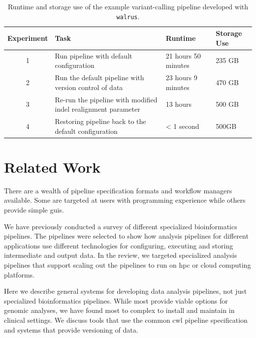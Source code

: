 \begin{table}[ht!]
    \centering
    \caption{Runtime and storage use of the example variant-calling pipeline
    developed with \texttt{walrus}.} 
    \begin{tabular}{ | c | p{4cm} | p{2cm} | p{2cm} |}
    \hline
    Experiment & Task & Runtime & Storage Use \\ \hline
    1 & Run pipeline with default configuration & 21 hours 50 minutes & 235 GB
        \\ \hline
    2 & Run the default pipeline with version control of data & 23 hours 9
        minutes & 470 GB \\ \hline
    3 & Re-run the pipeline with modified indel realignment parameter & 13 hours
        & 500 GB \\ \hline
    4 & Restoring pipeline back to the default configuration & < 1 second &
        500GB \\ \hline
    \end{tabular}
    \label{resultstable}
\end{table}




\section{Related Work} 
There are a wealth of pipeline specification formats and workflow managers
available. Some are targeted at users with programming experience while others
provide simple \glspl{gui}. 

We have previously conducted a survey of different
specialized bioinformatics pipelines.\cite{fjukstad2017review} 
The pipelines were selected to show how analysis pipelines for different
applications use different technologies for configuring, executing and storing
intermediate and output data. In the review, we targeted specialized analysis
pipelines that support scaling out the pipelines to run on \gls{hpc} or cloud
computing platforms. 

Here we describe general systems for developing data analysis
pipelines, not just specialized bioinformatics pipelines. While most provide
viable options for genomic analyses, we have found most to complex to install
and maintain in clinical settings. We discuss tools that use the common
\gls{cwl} pipeline specification and systems that provide versioning of data. 

